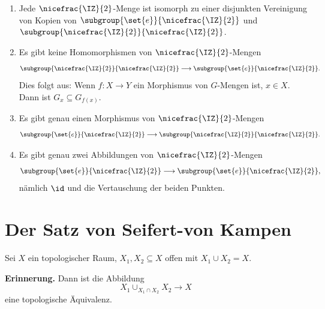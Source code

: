 \documentclass[language=ngerman]{TemplateLecture} %
\begin{document}
\begin{example}
\begin{enumerate}[$(i)$]
\begin{equation*}
            \begin{tikzcd}
                \IS^2 \arrow[d, "p"]\\ \IR P^2
            \end{tikzcd} \quad \longrightarrow \begin{tikzcd}
                \IS^2 \arrow[d, "p"] \\ \IR P^2,
            \end{tikzcd}
        \end{equation*}
        nämlich $\id_{\IS^2}$ und die Antipolabbildung $c: \IS^2 \to \IS^2$.
        \item Jede $\nicefrac{\IZ}{2}$-Menge ist isomorph zu einer disjunkten Vereinigung von Kopien von $\subgroup{\set{e}}{\nicefrac{\IZ}{2}}$ und $\subgroup{\nicefrac{\IZ}{2}}{\nicefrac{\IZ}{2}}$.
        \item Es gibt keine Homomorphismen von $\nicefrac{\IZ}{2}$-Mengen 
        \begin{equation*}
            \subgroup{\nicefrac{\IZ}{2}}{\nicefrac{\IZ}{2}} \longrightarrow \subgroup{\set{e}}{\nicefrac{\IZ}{2}}.
        \end{equation*}
        Dies folgt aus: Wenn $f: X \to Y$ ein Morphismus von $G$-Mengen ist, $x \in X$. Dann ist $G_x \subseteq G_{f(x)}$.
        \item Es gibt genau einen Morphismus von $\nicefrac{\IZ}{2}$-Mengen 
        \begin{equation*}
            \subgroup{\set{e}}{\nicefrac{\IZ}{2}} \longrightarrow \subgroup{\nicefrac{\IZ}{2}}{\nicefrac{\IZ}{2}}.
        \end{equation*}
        \item Es gibt genau zwei Abbildungen von $\nicefrac{\IZ}{2}$-Mengen
        \begin{equation*}
            \subgroup{\set{e}}{\nicefrac{\IZ}{2}} \longrightarrow \subgroup{\set{e}}{\nicefrac{\IZ}{2}},
        \end{equation*}
        nämlich $\id$ und die Vertauschung der beiden Punkten.
    \end{enumerate}
\end{example}

\chapter{Der Satz von Seifert-von Kampen}
Sei $X$ ein topologischer Raum, $X_1, X_2 \subseteq X$ offen mit $X_1 \cup X_2 = X$. 

\textbf{Erinnerung.} Dann ist die Abbildung 
\begin{equation*}
    X_1 \cup_{X_1 \cap X_2} X_2 \longrightarrow X
\end{equation*}
eine topologische Äquivalenz.
\end{document}
